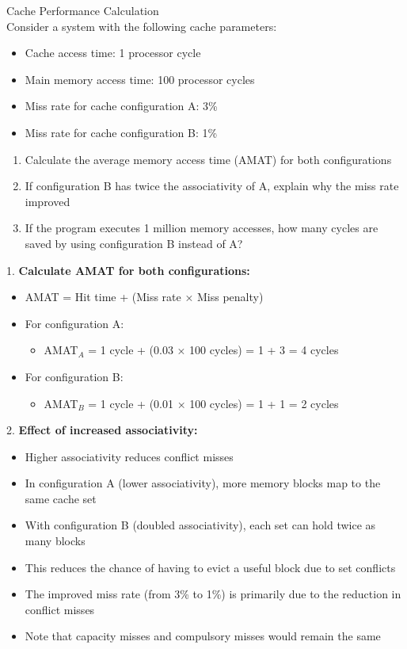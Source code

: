\begin{example2}{Cache Performance Calculation}\\
Consider a system with the following cache parameters:
\begin{itemize}
    \item Cache access time: 1 processor cycle
    \item Main memory access time: 100 processor cycles
    \item Miss rate for cache configuration A: 3\%
    \item Miss rate for cache configuration B: 1\%
\end{itemize}

\begin{enumerate}
    \item Calculate the average memory access time (AMAT) for both configurations
    \item If configuration B has twice the associativity of A, explain why the miss rate improved
    \item If the program executes 1 million memory accesses, how many cycles are saved by using configuration B instead of A?
\end{enumerate}

\tcblower

1. \textbf{Calculate AMAT for both configurations:}
   \begin{itemize}
     \item AMAT = Hit time + (Miss rate × Miss penalty)
     \item For configuration A:
     \begin{itemize}
       \item AMAT$_A$ = 1 cycle + (0.03 × 100 cycles) = 1 + 3 = 4 cycles
     \end{itemize}
     \item For configuration B:
     \begin{itemize}
       \item AMAT$_B$ = 1 cycle + (0.01 × 100 cycles) = 1 + 1 = 2 cycles
     \end{itemize}
   \end{itemize}

2. \textbf{Effect of increased associativity:}
   \begin{itemize}
     \item Higher associativity reduces conflict misses
     \item In configuration A (lower associativity), more memory blocks map to the same cache set
     \item With configuration B (doubled associativity), each set can hold twice as many blocks
     \item This reduces the chance of having to evict a useful block due to set conflicts
     \item The improved miss rate (from 3\% to 1\%) is primarily due to the reduction in conflict misses
     \item Note that capacity misses and compulsory misses would remain the same
   \end{itemize}


\end{example2}
